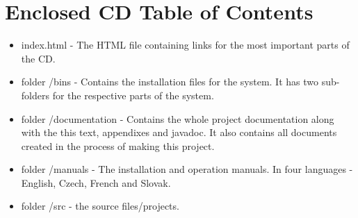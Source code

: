 \documentclass[11pt,twoside,a4paper]{book}
\begin{document}
\chapter{Enclosed CD Table of Contents}
\begin{itemize}
\item index.html - The HTML file containing links for the most important parts of the CD.
\item folder /bins - Contains the installation files for the system. It has two sub-folders for the respective parts of the system.
\item folder /documentation - Contains the whole project documentation along with the this text, appendixes and javadoc. It also contains all documents created in the process of making this project.
\item folder /manuals - The installation and operation manuals. In four languages - English, Czech, French and Slovak.
\item folder /src - the source files/projects.
\end{itemize}
\end{document}
